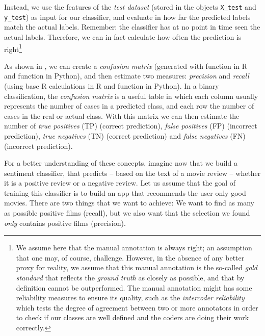 Instead, we use the features of the \emph{test dataset} (stored in the objects  \texttt{X\_test} and \texttt{y\_test})  as input for
our classifier, and evaluate in how far the predicted labels match the
actual labels.  Remember: the classifier has at no point in time seen
the actual labels.  Therefore, we can in fact calculate how often the
prediction is right\footnote{We assume here that the manual annotation
  is always right; an assumption that one may, of course,
  challenge. However, in the absence of any better proxy for reality,
  we assume that this manual annotation is the so-called \emph{gold
    standard} that reflects the \emph{ground truth} as closely as
  possible, and that by definition cannot be outperformed. The manual annotation might has some reliability measures to ensure its quality, such as the \emph{intercoder reliability} which tests the degree of agreement between two or more annotators in order to check if our classes are well defined and the coders are doing their work correctly.}


As shown in , we can create a \emph{confusion matrix} (generated with  function  in R and  function  in Python), and then estimate two measures: \emph{precision} and \emph{recall} (using base R calculations in R and  function  in Python). In a binary classification, the \emph{confusion matrix} is a useful table in which each column usually represents the number of cases in a predicted class, and each row the number of cases in the real or actual class. With this matrix we can then estimate the number of \emph{true positives} (TP) (correct prediction), \emph{false positives} (FP) (incorrect prediction), \emph{true negatives} (TN) (correct prediction) and \emph{false negatives} (FN) (incorrect prediction).

For a better understanding of these concepts, imagine now that we build a sentiment classifier, that predicts -- based on the
text of a movie review -- whether it is a positive review or a
negative review. Let us assume that the goal of training this classifier is to build an app that recommends the user only good movies. There are two things
that we want to achieve: We want to find as many as possible positive
films (recall), but we also want that the selection we found
\emph{only} contains positive films (precision).

